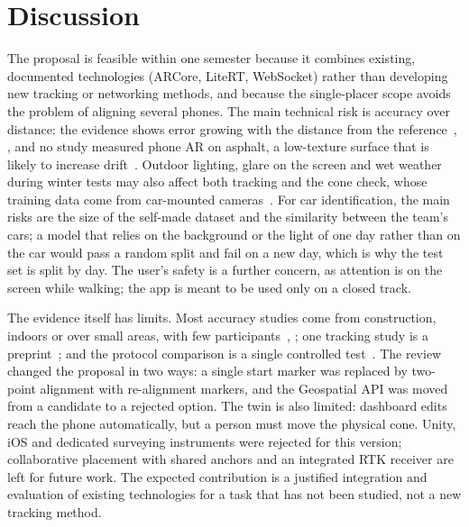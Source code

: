 \section{Discussion}
The proposal is feasible within one semester because it combines existing, documented technologies (ARCore, LiteRT, WebSocket) rather than developing new tracking or networking methods, and because the single-placer scope avoids the problem of aligning several phones. The main technical risk is accuracy over distance: the evidence shows error growing with the distance from the reference~\cite{chalhoub2019}, \cite{feigl2020}, and no study measured phone AR on asphalt, a low-texture surface that is likely to increase drift~\cite{scargill2021}. Outdoor lighting, glare on the screen and wet weather during winter tests may also affect both tracking and the cone check, whose training data come from car-mounted cameras~\cite{vodisch2022}. For car identification, the main risks are the size of the self-made dataset and the similarity between the team's cars; a model that relies on the background or the light of one day rather than on the car would pass a random split and fail on a new day, which is why the test set is split by day. The user's safety is a further concern, as attention is on the screen while walking; the app is meant to be used only on a closed track.

The evidence itself has limits. Most accuracy studies come from construction, indoors or over small areas, with few participants~\cite{chalhoub2019}, \cite{kim2025isarc}; one tracking study is a preprint~\cite{scargill2021}; and the protocol comparison is a single controlled test~\cite{ajayi2023}. The review changed the proposal in two ways: a single start marker was replaced by two-point alignment with re-alignment markers, and the Geospatial API was moved from a candidate to a rejected option. The twin is also limited: dashboard edits reach the phone automatically, but a person must move the physical cone. Unity, iOS and dedicated surveying instruments were rejected for this version; collaborative placement with shared anchors and an integrated RTK receiver are left for future work. The expected contribution is a justified integration and evaluation of existing technologies for a task that has not been studied, not a new tracking method.
